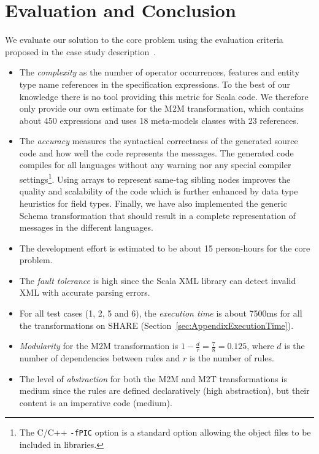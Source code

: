 \vspace*{-3mm}
\section{Evaluation and Conclusion}
\label{sec:EvaluationConclusion}

\enlargethispage{7mm}

We evaluate our solution to the core problem using the evaluation criteria proposed in the case study description~\cite{Lano2014}.

\begin{itemize}[-]
  \item The \emph{complexity} as the number of operator occurrences, features and entity type name references in the specification expressions.
  To the best of our knowledge there is no tool providing this metric for Scala code.
  We therefore only provide our own estimate for the M2M transformation, which contains about 450 expressions and uses 18 meta-models classes with 23 references.

  \item The \emph{accuracy} measures the syntactical correctness of the generated source code and how well the code represents the \FIXML messages.
  The generated code compiles for all languages without any warning nor any special compiler settings\footnote{The C/C++ \texttt{-fPIC} option is a standard option allowing the object files to be included in libraries.}.
  Using arrays to represent same-tag sibling nodes improves the quality and scalability of the code which is further enhanced by data type heuristics for field types.
  Finally, we have also implemented the generic \FIXML Schema transformation that should result in a complete representation of \FIXML messages in the different languages.

  \item The development effort is estimated to be about 15 person-hours for the core problem.

  \item The \emph{fault tolerance} is high since the Scala XML library can detect invalid XML with accurate parsing errors.

  \item For all test cases (1, 2, 5 and 6), the \emph{execution time} is about 7500ms for all the transformations on SHARE (\Cf Section~\ref{sec:AppendixExecutionTime}).

  \item \emph{Modularity} for the M2M transformation is $1 - \frac{d}{r} = \frac{7}{8} = 0.125$, where $d$ is the number of dependencies between rules and $r$ is the number of rules.

  \item The level of \emph{abstraction} for both the M2M and M2T transformations is medium since the rules are defined declaratively (high abstraction), but their content is an imperative code (medium).

\end{itemize}

